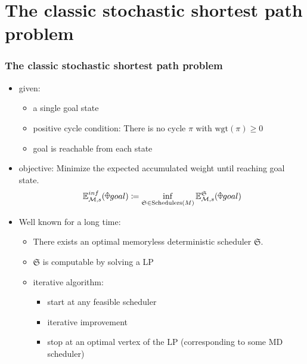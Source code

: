 \documentclass[onlymath]{beamer}
\begin{document}
\section{The classic stochastic shortest path problem}

\begin{frame}
\frametitle{The classic stochastic shortest path problem}
	\begin{itemize}
		\item given:
		\begin{itemize}
			\item a single goal state
			\item positive cycle condition: There is no cycle $\pi$ with ${\mathrm{wgt}(\pi)} \geq 0$
			\item goal is reachable from each state
		\end{itemize}
		\item objective: Minimize the expected accumulated weight until reaching goal state.\[
			\mathbb{E}_{\mathcal{M},s}^{inf}(\rawdiaplus goal) \coloneqq \inf_{\mathfrak{S} \in \mathrm{Schedulers}(M)}\mathbb{E}_{\mathcal{M},s}^{\mathfrak{S}}(\rawdiaplus goal)
		\]
		\item Well known for a long time:
		\begin{itemize}
			\item There exists an optimal memoryless deterministic scheduler $\mathfrak{S}$.
			\item $\mathfrak{S}$ is computable by solving a LP
			\item iterative algorithm:
			\begin{itemize}
				\item start at any feasible scheduler
				\item iterative improvement
				\item stop at an optimal vertex of the LP (corresponding to some MD scheduler)
			\end{itemize}
		\end{itemize}
	\end{itemize}
\end{frame}%
\end{document}
